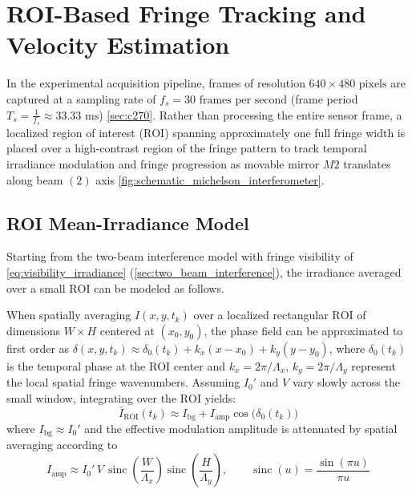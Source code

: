 \section{ROI-Based Fringe Tracking and Velocity Estimation}
\label{sec:roi_fringe_velocity}

In the experimental acquisition pipeline, frames of resolution $640 \times 480\text{ pixels}$ are captured at a sampling rate of $f_s = 30\text{ frames per second}$ (frame period $T_s = \frac{1}{f_s} \approx 33.33\text{ ms}$) \cref{sec:c270}. Rather than processing the entire sensor frame, a localized region of interest ($\text{ROI}$) spanning approximately one full fringe width is placed over a high-contrast region of the fringe pattern to track temporal irradiance modulation and fringe progression as movable mirror $M2$ translates along beam $(2)$ axis \cref{fig:schematic_michelson_interferometer}.



\subsection{ROI Mean-Irradiance Model}
\label{sec:roi_model_validity}

Starting from the two-beam interference model with fringe visibility of \cref{eq:visibility_irradiance} (\cref{sec:two_beam_interference}), the irradiance averaged over a small $\text{ROI}$ can be modeled as follows.

When spatially averaging $I(x, y, t_k)$ over a localized rectangular $\text{ROI}$ of dimensions $W \times H$ centered at $(x_0, y_0)$, the phase field can be approximated to first order as $\delta(x, y, t_k) \approx \delta_0(t_k) + k_x(x - x_0) + k_y(y - y_0)$, where $\delta_0(t_k)$ is the temporal phase at the $\text{ROI}$ center and $k_x = 2\pi/\Lambda_x$, $k_y = 2\pi/\Lambda_y$ represent the local spatial fringe wavenumbers. Assuming $I_0'$ and $V$ vary slowly across the small window, integrating over the $\text{ROI}$ yields:
\begin{equation}
    \bar{I}_{\text{ROI}}(t_k) \approx I_{\text{bg}} + I_{\text{amp}}\cos\!\bigl(\delta_0(t_k)\bigr)
    \label{eq:roi_irradiance_model_justified}
\end{equation}
where $I_{\text{bg}} \approx I_0'$ and the effective modulation amplitude is attenuated by spatial averaging according to
\begin{equation}
    I_{\text{amp}} \approx I_0'\,V\,\operatorname{sinc}\!\left(\frac{W}{\Lambda_x}\right)\operatorname{sinc}\!\left(\frac{H}{\Lambda_y}\right), \qquad \operatorname{sinc}(u) = \frac{\sin(\pi u)}{\pi u}
    \label{eq:roi_sinc_attenuation}
\end{equation}

